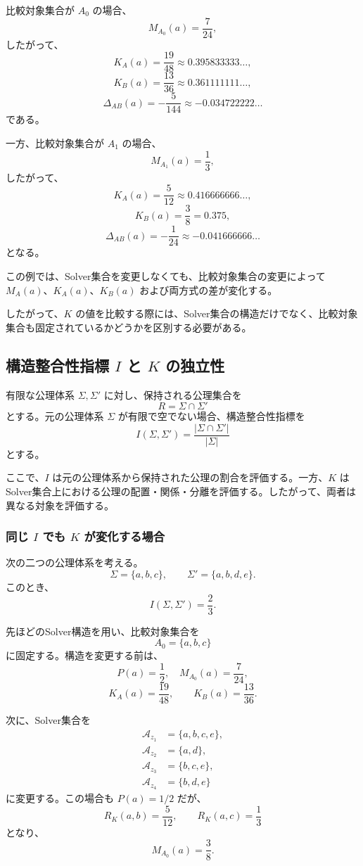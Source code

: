 \documentclass[a4paper,11pt]{ltjsarticle}
\begin{document}
比較対象集合が $A_0$ の場合、
\[
M_{A_0}(a)=\frac{7}{24},
\]
したがって、
\[
K_A(a)=\frac{19}{48}
\approx 0.395833333\ldots,
\]
\[
K_B(a)=\frac{13}{36}
\approx 0.361111111\ldots,
\]
\[
\Delta_{AB}(a)=-\frac5{144}
\approx -0.034722222\ldots
\]
である。

一方、比較対象集合が $A_1$ の場合、
\[
M_{A_1}(a)=\frac13,
\]
したがって、
\[
K_A(a)=\frac5{12}
\approx 0.416666666\ldots,
\]
\[
K_B(a)=\frac38=0.375,
\]
\[
\Delta_{AB}(a)=-\frac1{24}
\approx -0.041666666\ldots
\]
となる。

この例では、Solver集合を変更しなくても、比較対象集合の変更によって $M_A(a)$、$K_A(a)$、$K_B(a)$ および両方式の差が変化する。

したがって、$K$ の値を比較する際には、Solver集合の構造だけでなく、比較対象集合も固定されているかどうかを区別する必要がある。

\subsection{構造整合性指標 $I$ と $K$ の独立性}

有限な公理体系 $\Sigma,\Sigma'$ に対し、保持される公理集合を
\[
R=\Sigma\cap\Sigma'
\]
とする。元の公理体系 $\Sigma$ が有限で空でない場合、構造整合性指標を
\[
I(\Sigma,\Sigma')
=\frac{|\Sigma\cap\Sigma'|}{|\Sigma|}
\tag{8}
\]
とする。

ここで、$I$ は元の公理体系から保持された公理の割合を評価する。一方、$K$ はSolver集合上における公理の配置・関係・分離を評価する。したがって、両者は異なる対象を評価する。

\subsubsection{同じ $I$ でも $K$ が変化する場合}

次の二つの公理体系を考える。
\[
\Sigma=\{a,b,c\},\qquad
\Sigma'=\{a,b,d,e\}.
\]
このとき、
\[
I(\Sigma,\Sigma')=\frac23.
\]

先ほどのSolver構造を用い、比較対象集合を
\[
A_0=\{a,b,c\}
\]
に固定する。構造を変更する前は、
\[
P(a)=\frac12,\quad
M_{A_0}(a)=\frac7{24},
\]
\[
K_A(a)=\frac{19}{48},\qquad
K_B(a)=\frac{13}{36}.
\]

次に、Solver集合を
\[
\begin{aligned}
\mathcal{A}_{z_1}&=\{a,b,c,e\},\\
\mathcal{A}_{z_2}&=\{a,d\},\\
\mathcal{A}_{z_3}&=\{b,c,e\},\\
\mathcal{A}_{z_4}&=\{b,d,e\}
\end{aligned}
\]
に変更する。この場合も $P(a)=1/2$ だが、
\[
R_K(a,b)=\frac5{12},\qquad
R_K(a,c)=\frac13
\]
となり、
\[
M_{A_0}(a)=\frac38.
\]
\end{document}
